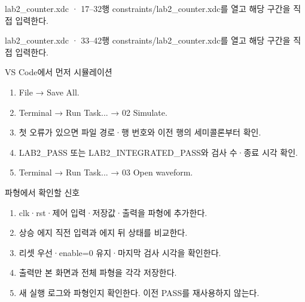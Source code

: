 \begin{frame}{lab2\_counter.xdc · 17–32행}
\small
constraints/lab2\_counter.xdc를 열고 해당 구간을 직접 입력한다.\par\vspace{0.4cm}\par\vspace{0.4cm}
\end{frame}

\begin{frame}{lab2\_counter.xdc · 33–42행}
\small
constraints/lab2\_counter.xdc를 열고 해당 구간을 직접 입력한다.\par\vspace{0.4cm}\par\vspace{0.4cm}
\end{frame}

\begin{frame}[label=simulation]{VS Code에서 먼저 시뮬레이션}
\small
\begin{enumerate}
\item File → Save All.
\item Terminal → Run Task... → 02 Simulate.
\item 첫 오류가 있으면 파일 경로·행 번호와 이전 행의 세미콜론부터 확인.
\item LAB2\_PASS 또는 LAB2\_INTEGRATED\_PASS와 검사 수·종료 시각 확인.
\item Terminal → Run Task... → 03 Open waveform.
\end{enumerate}
\end{frame}

\begin{frame}{파형에서 확인할 신호}
\small
\begin{enumerate}
\item clk·rst·제어 입력·저장값·출력을 파형에 추가한다.
\item 상승 에지 직전 입력과 에지 뒤 상태를 비교한다.
\item 리셋 우선·enable=0 유지·마지막 검사 시각을 확인한다.
\item 출력만 본 화면과 전체 파형을 각각 저장한다.
\item 새 실행 로그와 파형인지 확인한다. 이전 PASS를 재사용하지 않는다.
\end{enumerate}
\end{frame}

